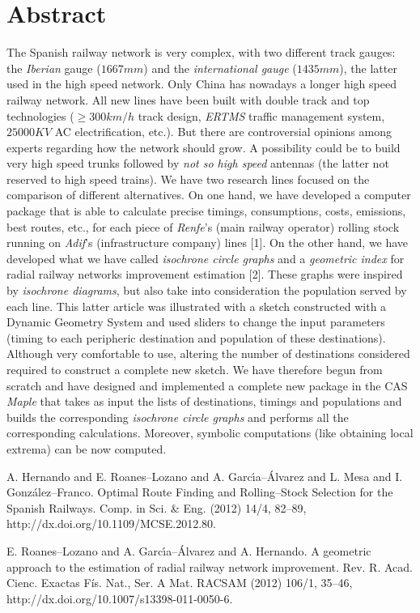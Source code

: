 \documentclass[article,A4,11pt]{llncs}%
\begin{document}
\section*{Abstract}
The Spanish railway network is very complex, with two different track gauges: the \textit{Iberian} gauge ($1667 mm$) and the \textit{international gauge} ($1435 mm$), the latter used in the high speed network. Only China has nowadays a longer high speed railway network. All new lines have been built with double track and top technologies
($\geq 300 km/h$ track design, \textit{ERTMS} traffic management system, $25000 KV$ AC electrification, etc.). But there are controversial opinions among experts regarding how the network should grow. A possibility could be to build very high speed trunks followed by \textit{not so high speed} antennas (the latter not reserved to high speed trains). We have two research lines focused on the comparison of different alternatives. On one hand, we have developed a computer package that is able to calculate precise timings, consumptions, costs, emissions, best routes, etc., for each piece of \textit{Renfe}'s (main railway operator) rolling stock running on \textit{Adif}'s (infrastructure company) lines [1]. On the other hand, we have developed what we have called \textit{isochrone circle graphs} and a \textit{geometric index} for radial railway networks improvement estimation [2]. These graphs were inspired by \textit{isochrone diagrams}, but also take into consideration the population served by each line. This latter article was illustrated with a sketch constructed with a Dynamic Geometry System and used sliders to change the input parameters (timing to each peripheric destination and population of these destinations). Although very comfortable to use, altering the number of destinations considered required to construct a complete new sketch. We have therefore begun from scratch and have designed and implemented a complete new package in the CAS \textit{Maple} that takes as input the lists of destinations, timings and populations and builds the corresponding \textit{isochrone circle graphs} and performs all the corresponding calculations. Moreover, symbolic computations (like obtaining local extrema) can be now computed.



\begin{thebibliography}{10}
{\sc A. Hernando and E. Roanes--Lozano and A. Garc\'{\i}a--\'Alvarez and L. Mesa and I. Gonz\'alez--Franco}. {Optimal Route Finding and Rolling--Stock Selection for the Spanish Railways}. Comp. in Sci. \& Eng. (2012) 14/4, 82--89,  http://dx.doi.org/10.1109/MCSE.2012.80.

{\sc E. Roanes--Lozano and A. Garc\'{\i}a--\'Alvarez and A. Hernando}. {A geometric approach to the estimation of radial railway network improvement}. Rev. R. Acad. Cienc. Exactas F\'is. Nat., Ser. A Mat. RACSAM (2012) 106/1, 35--46, http://dx.doi.org/10.1007/s13398-011-0050-6.
\end{thebibliography}
\end{document}
